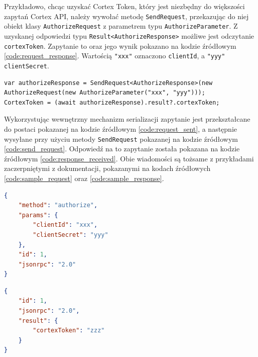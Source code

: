 \documentclass[skorowidz,skroty]{dyplomWEZUT}
\begin{document}
Przykładowo, chcąc uzyskać Cortex Token, który jest niezbędny do większości zapytań Cortex API, należy wywołać metodę \lstinline[language={[Sharp]C}]{SendRequest}, przekazując do niej obiekt klasy \lstinline[language={[Sharp]C}]{AuthorizeRequest} z parametrem typu \lstinline[language={[Sharp]C}]{AuthorizeParameter}. Z uzyskanej odpowiedzi typu \lstinline[language={[Sharp]C}]{Result<AuthorizeResponse>} możliwe jest odczytanie \lstinline[language={[Sharp]C}]{cortexToken}. Zapytanie to oraz jego wynik pokazano na kodzie źródłowym \ref{code:request_response}. Wartością \lstinline[language={[Sharp]C}]{"xxx"} oznaczono \lstinline[language={[Sharp]C}]{clientId}, a \lstinline[language={[Sharp]C}]{"yyy"} \lstinline[language={[Sharp]C}]{clientSecret}.

\begin{lstlisting}[language={[Sharp]C}]
var authorizeResponse = SendRequest<AuthorizeResponse>(new AuthorizeRequest(new AuthorizeParameter("xxx", "yyy")));
CortexToken = (await authorizeResponse).result?.cortexToken;
\end{lstlisting}

Wykorzystując wewnętrzny mechanizm serializacji zapytanie jest przekształcane do postaci pokazanej na kodzie źródłowym \ref{code:request_sent}, a następnie wysyłane przy użyciu metody \lstinline[language={[Sharp]C}]{SendRequest} pokazanej na kodzie źródłowym \ref{code:send_request}. Odpowiedź na to zapytanie została pokazana na kodzie źródłowym \ref{code:response_received}. Obie wiadomości są tożsame z przykładami zaczerpniętymi z dokumentacji, pokazanymi na kodach źródłowych \ref{code:sample_request} oraz \ref{code:sample_response}.

\begin{lstlisting}[language=json]
{
    "method": "authorize",
    "params": {
        "clientId": "xxx",
        "clientSecret": "yyy"
    },
    "id": 1,
    "jsonrpc": "2.0"
}
\end{lstlisting}

\begin{lstlisting}[language=json]
{
    "id": 1,
    "jsonrpc": "2.0",
    "result": {
        "cortexToken": "zzz"
    }
}
\end{lstlisting}
\end{document}
